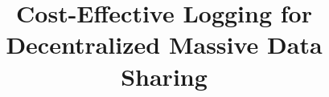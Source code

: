 \documentclass{svproc}
\begin{document}
\title{Cost-Effective Logging for \\ Decentralized Massive Data Sharing \\%
}


\maketitle
\end{document}

